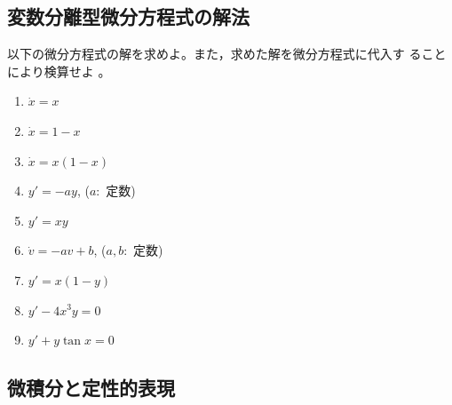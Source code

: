 \documentclass[twocolumn,11pt]{jarticle}
\begin{document}
\subsection{変数分離型微分方程式の解法}
以下の微分方程式の解を求めよ。また，求めた解を微分方程式に代入す
ることにより検算せよ
。
\begin{enumerate}
\item \label{item:dx=x}$\dot{x}=x$
\item \label{item:dx=1-x} $\dot{x}=1-x$
\item \label{item:dx=x(1-x)} $\dot{x}=x(1-x)$
\item \label{item:dy+ay}$y'=-ay$, ($a:$ 定数)
\item \label{item:dy-xy}$y'=xy$
\item \label{item:dv+av-b}$\dot{v}=-av+b$, \quad($a,b:$ 定数)
\item \label{item:dy-x(1-y)}$y'=x(1-y)$
\item \label{item:dy-4x3y}$y'-4x^3y=0$
\item \label{item:dy+ytanx}$y'+y\tan x=0$
\end{enumerate}


\subsection{微積分と定性的表現}

\end{document}

